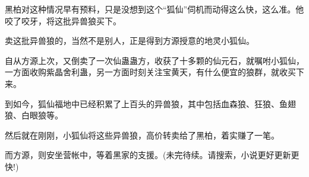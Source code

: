 \begin{this_body}
黑柏对这种情况早有预料，只是没想到这个“狐仙”伺机而动得这么快，这么准。他咬了咬牙，将这批异兽狼买下。

卖这批异兽狼的，当然不是别人，正是得到方源授意的地灵小狐仙。

自从方源上次，又倒卖了一次仙蛊蛊方，收获了十多颗的仙元石，就嘱咐小狐仙，一方面收购紫晶舍利蛊，另一方面时刻关注宝黄天，有什么便宜的狼群，就收买下来。

到如今，狐仙福地中已经积累了上百头的异兽狼，其中包括血森狼、狂狼、鱼翅狼、白眼狼等。

然后就在刚刚，小狐仙将这些异兽狼，高价转卖给了黑柏，着实赚了一笔。

而方源，则安坐营帐中，等着黑家的支援。(未完待续。请搜索，小说更好更新更快!)

\end{this_body}

